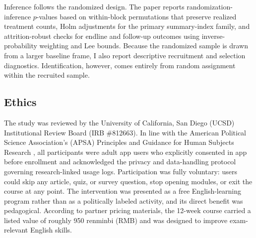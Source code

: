 \documentclass[12pt,american]{article}
\begin{document}
	Inference follows the randomized design. The paper reports randomization-inference \(p\)-values based on within-block permutations that preserve realized treatment counts, Holm adjustments for the primary summary-index family, and attrition-robust checks for endline and follow-up outcomes using inverse-probability weighting and Lee bounds. Because the randomized sample is drawn from a larger baseline frame, I also report descriptive recruitment and selection diagnostics. Identification, however, comes entirely from random assignment within the recruited sample.
	
	\subsection*{Ethics}
	
The study was reviewed by the University of California, San Diego (UCSD) Institutional Review Board (IRB \#812663). In line with the American Political Science Association's (APSA) Principles and Guidance for Human Subjects Research \citep{APSA2020Principles}, all participants were adult app users who explicitly consented in app before enrollment and acknowledged the privacy and data-handling protocol governing research-linked usage logs. Participation was fully voluntary: users could skip any article, quiz, or survey question, stop opening modules, or exit the course at any point. The intervention was presented as a free English-learning program rather than as a politically labeled activity, and its direct benefit was pedagogical. According to partner pricing materials, the 12-week course carried a listed value of roughly 950 renminbi (RMB) and was designed to improve exam-relevant English skills.
\end{document}
